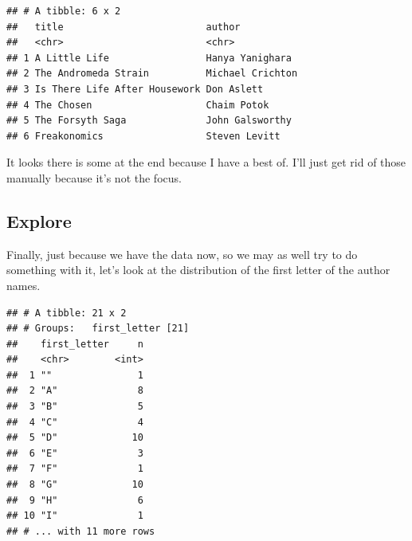 \documentclass[
]{book}
\newenvironment{Shaded}{\begin{snugshade}}{\end{snugshade}}
\newcommand{\DataTypeTok}[1]{\textcolor[rgb]{0.13,0.29,0.53}{#1}}
\newcommand{\DecValTok}[1]{\textcolor[rgb]{0.00,0.00,0.81}{#1}}
\newcommand{\KeywordTok}[1]{\textcolor[rgb]{0.13,0.29,0.53}{\textbf{#1}}}
\newcommand{\NormalTok}[1]{#1}
\newcommand{\OperatorTok}[1]{\textcolor[rgb]{0.81,0.36,0.00}{\textbf{#1}}}
\newcommand{\StringTok}[1]{\textcolor[rgb]{0.31,0.60,0.02}{#1}}
\begin{document}
\begin{Shaded}
\begin{Highlighting}[]
{{{{{{{{{\KeywordTok{head}\NormalTok{(all_books)}
\end{Highlighting}
\end{Shaded}

\begin{verbatim}
## # A tibble: 6 x 2
##   title                         author          
##   <chr>                         <chr>           
## 1 A Little Life                 Hanya Yanighara 
## 2 The Andromeda Strain          Michael Crichton
## 3 Is There Life After Housework Don Aslett      
## 4 The Chosen                    Chaim Potok     
## 5 The Forsyth Saga              John Galsworthy 
## 6 Freakonomics                  Steven Levitt
\end{verbatim}

It looks there is some at the end because I have a best of. I'll just get rid of those manually because it's not the focus.

\begin{Shaded}
\end{Shaded}

\hypertarget{explore}{%
\subsection{Explore}\label{explore}}

Finally, just because we have the data now, so we may as well try to do something with it, let's look at the distribution of the first letter of the author names.

\begin{Shaded}
\end{Shaded}

\begin{verbatim}
## # A tibble: 21 x 2
## # Groups:   first_letter [21]
##    first_letter     n
##    <chr>        <int>
##  1 ""               1
##  2 "A"              8
##  3 "B"              5
##  4 "C"              4
##  5 "D"             10
##  6 "E"              3
##  7 "F"              1
##  8 "G"             10
##  9 "H"              6
## 10 "I"              1
## # ... with 11 more rows
\end{verbatim}
\end{document}
